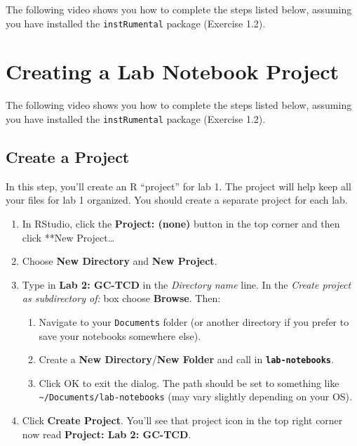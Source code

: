 \documentclass[]{tufte-book}
\providecommand{\tightlist}{%
  \setlength{\itemsep}{0pt}\setlength{\parskip}{0pt}}
\begin{document}
The following video shows you how to complete the steps listed below, assuming you have installed the \texttt{instRumental} package (Exercise 1.2).

\hypertarget{create-lab-notebook}{%
\section{Creating a Lab Notebook Project}\label{create-lab-notebook}}

The following video shows you how to complete the steps listed below, assuming you have installed the \texttt{instRumental} package (Exercise 1.2).

\hypertarget{create-a-project}{%
\subsection{Create a Project}\label{create-a-project}}

In this step, you'll create an R ``project'' for lab 1. The project will help keep all your files for lab 1 organized. You should create a separate project for each lab.

\begin{enumerate}
\def\labelenumi{\arabic{enumi}.}
\tightlist
\item
  In RStudio, click the \textbf{Project: (none)} button in the top corner and then click **New Project\ldots*
\item
  Choose \textbf{New Directory} and \textbf{New Project}.
\item
  Type in \textbf{Lab 2: GC-TCD} in the \emph{Directory name} line. In the \emph{Create project as subdirectory of:} box choose \textbf{Browse}. Then:

  \begin{enumerate}
  \def\labelenumii{\arabic{enumii}.}
  \tightlist
  \item
    Navigate to your \texttt{Documents} folder (or another directory if you prefer to save your notebooks somewhere else).
  \item
    Create a \textbf{New Directory}/\textbf{New Folder} and call in \textbf{\texttt{lab-notebooks}}.
  \item
    Click OK to exit the dialog. The path should be set to something like \texttt{\textasciitilde{}/Documents/lab-notebooks} (may vary slightly depending on your OS).
  \end{enumerate}
\item
  Click \textbf{Create Project}. You'll see that project icon in the top right corner now read \textbf{Project: Lab 2: GC-TCD}.
\end{enumerate}
\end{document}
